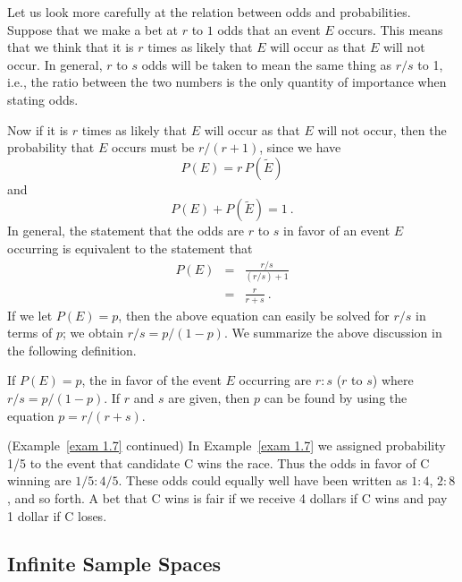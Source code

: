 Let us look more carefully at the relation between odds and probabilities.
Suppose that we make a bet at $r$ to $1$ odds that an event $E$ occurs. 
This means that we  think that it is $r$ times as likely that $E$ will occur
as that $E$
will not occur.  In general, $r$ to $s$ odds will be taken to mean the same
thing as
$r/s$ to 1, i.e., the ratio between the two numbers is the only quantity of
importance when stating odds.  
\par
Now if it is $r$ times as likely that $E$ will occur as that $E$ will
not occur, then the probability that $E$ occurs must be $r/(r+1)$, since we
have
$$P(E) = r\,P(\tilde E)$$
and
$$P(E) + P(\tilde E) = 1\ .$$
In general, the statement that the odds are $r$ to $s$ in favor of an event
$E$
occurring is equivalent to the statement that 
\begin{eqnarray*}
P(E) & = & \frac{r/s}{(r/s) + 1}\\
& = & \frac {r}{r+s}\ .
\end{eqnarray*}
If we let $P(E) = p$, then the above equation can easily be solved for $r/s$
in terms of
$p$; we obtain $r/s = p/(1-p)$.  We summarize the above discussion in the
following definition. 

\begin{definition}\label{def 1.4} 
If $P(E) = p$, the  in favor of the event $E$ occurring are $r :
s$ ($r$ to $s$) where $r/s = p/(1-p)$.  If $r$ and $s$ are given, then $p$ 
can be found by using the equation $p = r/(r+s)$.
\end{definition}
\begin{example}(Example~\ref{exam 1.7} continued)\label{exam 1.9}
In Example~\ref{exam 1.7} we assigned probability 1/5 to the event that
candidate C wins the race.  Thus the odds in favor of C winning are $1/5 :
4/5$.  These odds could equally well have been written as $1 : 4$, $2
: 8$, and so forth.  A bet that C wins is fair if we receive 4 dollars
if C wins and pay 1 dollar if C loses.
\end{example}

\subsection*{Infinite Sample Spaces}

